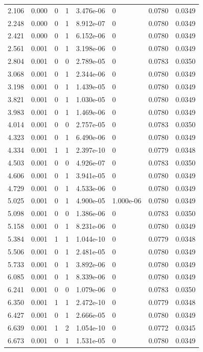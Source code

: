 \documentclass[preview]{standalone}
\begin{document}
{{\begin{tabular}{L{1.2cm}C{1.2cm} C{0.3cm}C{0.5cm} C{1.4cm}C{1.4cm} C{1.4cm}C{1.4cm}}
  2.106  &  0.000  & 0     &  1 &  3.476e-06  & 0  & 0.0780 &  0.0349   \\ 
  2.248  &  0.000  & 0     &  1 &  8.912e-07  & 0  & 0.0780 &  0.0349   \\ 
  2.421  &  0.000  & 0     &  1 &  6.152e-06  & 0  & 0.0780 &  0.0349   \\ 
  2.561  &  0.001  & 0     &  1 &  3.198e-06  & 0  & 0.0780 &  0.0349   \\ 
  2.804  &  0.001  & 0     &  0 &  2.789e-05  & 0  & 0.0783 &  0.0350   \\ 
  3.068  &  0.001  & 0     &  1 &  2.344e-06  & 0  & 0.0780 &  0.0349   \\ 
  3.198  &  0.001  & 0     &  1 &  1.439e-05  & 0  & 0.0780 &  0.0349   \\ 
  3.821  &  0.001  & 0     &  1 &  1.030e-05  & 0  & 0.0780 &  0.0349   \\ 
  3.983  &  0.001  & 0     &  1 &  1.469e-06  & 0  & 0.0780 &  0.0349   \\ 
  4.014  &  0.001  & 0     &  0 &  2.757e-05  & 0  & 0.0783 &  0.0350   \\ 
  4.323  &  0.001  & 0     &  1 &  6.490e-06  & 0  & 0.0780 &  0.0349   \\ 
  4.334  &  0.001  & 1     &  1 &  2.397e-10  & 0  & 0.0779 &  0.0348   \\ 
  4.503  &  0.001  & 0     &  0 &  4.926e-07  & 0  & 0.0783 &  0.0350   \\ 
  4.606  &  0.001  & 0     &  1 &  3.941e-05  & 0  & 0.0780 &  0.0349   \\ 
  4.729  &  0.001  & 0     &  1 &  4.533e-06  & 0  & 0.0780 &  0.0349   \\ 
  5.025  &  0.001  & 0     &  1 &  4.900e-05  & 1.000e-06  & 0.0780 &  0.0349   \\ 
  5.098  &  0.001  & 0     &  0 &  1.386e-06  & 0  & 0.0783 &  0.0350   \\ 
  5.158  &  0.001  & 0     &  1 &  8.231e-06  & 0  & 0.0780 &  0.0349   \\ 
  5.384  &  0.001  & 1     &  1 &  1.044e-10  & 0  & 0.0779 &  0.0348   \\ 
  5.506  &  0.001  & 0     &  1 &  2.481e-05  & 0  & 0.0780 &  0.0349   \\ 
  5.733  &  0.001  & 0     &  1 &  3.892e-06  & 0  & 0.0780 &  0.0349   \\ 
  6.085  &  0.001  & 0     &  1 &  8.339e-06  & 0  & 0.0780 &  0.0349   \\ 
  6.241  &  0.001  & 0     &  0 &  1.079e-06  & 0  & 0.0783 &  0.0350   \\ 
  6.350  &  0.001  & 1     &  1 &  2.472e-10  & 0  & 0.0779 &  0.0348   \\ 
  6.427  &  0.001  & 0     &  1 &  2.666e-05  & 0  & 0.0780 &  0.0349   \\ 
  6.639  &  0.001  & 1     &  2 &  1.054e-10  & 0  & 0.0772 &  0.0345   \\ 
  6.673  &  0.001  & 0     &  1 &  1.531e-05  & 0  & 0.0780 &  0.0349   \\ 
\hline 
\end{tabular} 

}}
\end{document}
